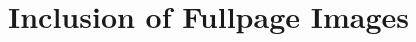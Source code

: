 \documentclass{scrartcl}
\begin{document}
\section{Inclusion of Fullpage Images}

\Blindtext[1]


\end{document}
